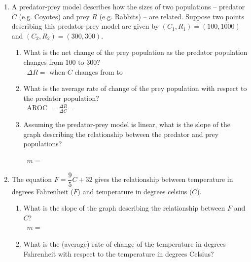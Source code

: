 \documentclass[10pt]{article}
\begin{document}
    \begin{enumerate}
    \item[(a)] A predator-prey model describes how the sizes of two populations -- predator $C$ (e.g. Coyotes) and prey $R$ (e.g. Rabbits) -- are related. Suppose two points describing this predator-prey model  are given by $(C_1,R_1)=(100,1000)$ and $(C_2,R_2)=(300,300)$.
        \begin{enumerate}
        \item[i.] What is the net change of the prey population as the predator population changes from $100$ to $300$?\\
            \,\hfill
            {\Large $\Delta R=$ when $C$ changes from to   } 
            \hfill\,\\        
        \item[ii.] What is the average rate of change of the prey population with respect to the predator population?\\    
            \,\hfill
            {\Large AROC $=\frac{\Delta R}{\Delta C}=$ } %
            \hfill\,\\
        \item[iii.] Assuming the predator-prey model is linear, what is the slope of the graph describing the relationship between the predator and prey populations?

            \,\hfill
            {\Large $m=$  }
            \hfill\,\\    
            
        \end{enumerate}
    \item[(b)] The equation $F=\dfrac95C+32$ gives the relationship between temperature in degrees Fahrenheit ($F$) and temperature in degrees celsius ($C$). 
        \begin{enumerate}
        \item[i.] What is the slope of the graph describing the relationship between $F$ and $C$?\\
            \,\hfill
            {\Large $m=$ }
            \hfill\,\\
        \item[ii.] What is the (average) rate of change of the temperature in degrees Fahrenheit with respect to the temperature in degrees Celsius?\\
            

\end{enumerate}
\end{enumerate}
\end{document}
